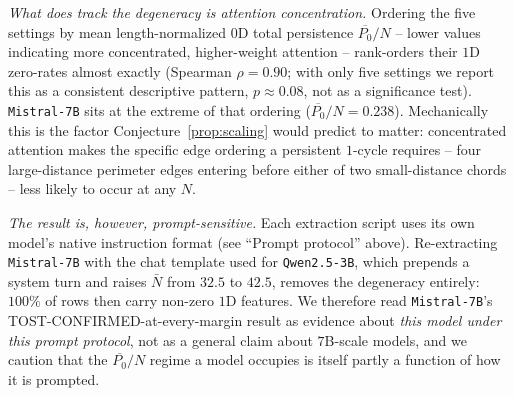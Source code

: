 \documentclass{article}
\begin{document}
\emph{What does track the degeneracy is attention concentration.} Ordering the five settings by mean length-normalized $0$D total persistence $\overline{P_0}/N$ -- lower values indicating more concentrated, higher-weight attention -- rank-orders their $1$D zero-rates almost exactly (Spearman $\rho=0.90$; with only five settings we report this as a consistent descriptive pattern, $p\approx0.08$, not as a significance test). \texttt{Mistral-7B} sits at the extreme of that ordering ($\overline{P_0}/N=0.238$). Mechanically this is the factor Conjecture~\ref{prop:scaling} would predict to matter: concentrated attention makes the specific edge ordering a persistent $1$-cycle requires -- four large-distance perimeter edges entering before either of two small-distance chords -- less likely to occur at any $N$.

\emph{The result is, however, prompt-sensitive.} Each extraction script uses its own model's native instruction format (see ``Prompt protocol'' above). Re-extracting \texttt{Mistral-7B} with the chat template used for \texttt{Qwen2.5-3B}, which prepends a system turn and raises $\bar N$ from $32.5$ to $42.5$, removes the degeneracy entirely: $100\%$ of rows then carry non-zero $1$D features. We therefore read \texttt{Mistral-7B}'s TOST-CONFIRMED-at-every-margin result as evidence about \emph{this model under this prompt protocol}, not as a general claim about $7$B-scale models, and we caution that the $\overline{P_0}/N$ regime a model occupies is itself partly a function of how it is prompted.
\end{document}
